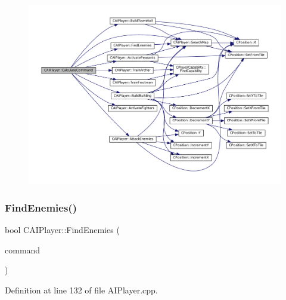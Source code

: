 \begin{figure}[H]
\begin{center}
\leavevmode
\includegraphics[width=350pt]{classCAIPlayer_ae2742efd250c7d6c00b659ccc29c4be3_cgraph}
\end{center}
\end{figure}
\hypertarget{classCAIPlayer_a33b1533570e7a00114d1b85b3551e395}{}\label{classCAIPlayer_a33b1533570e7a00114d1b85b3551e395} 
\subsubsection{\texorpdfstring{Find\+Enemies()}{FindEnemies()}}
{\footnotesize\ttfamily bool C\+A\+I\+Player\+::\+Find\+Enemies (\begin{DoxyParamCaption}\item[{\hyperlink{structSPlayerCommandRequest}{S\+Player\+Command\+Request} \&}]{command }\end{DoxyParamCaption})\hspace{0.3cm}{\ttfamily [protected]}}



Definition at line 132 of file A\+I\+Player.\+cpp.


